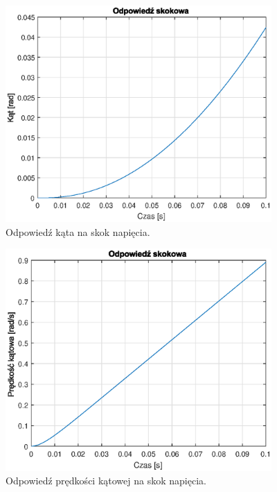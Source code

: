 \begin{figure}[h]
	\centering
	\includegraphics[width=4in]{Figures/step_ang.eps}
	\caption{Odpowiedź kąta na skok napięcia.}
	\label{fig:step}
\end{figure}

\begin{figure}[h]
	\centering
	\includegraphics[width=4in]{Figures/step_vel.eps}
	\caption{Odpowiedź prędkości kątowej na skok napięcia.}
	\label{fig:step}
\end{figure}